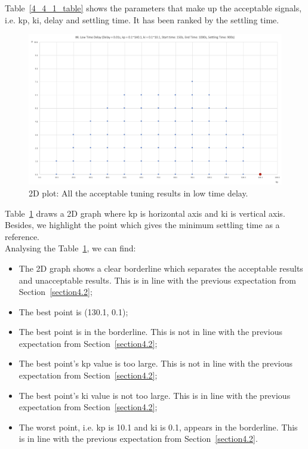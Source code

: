 Table~\ref{4_4_1_table} shows the parameters that make up the acceptable signals, i.e. kp, ki, delay and settling time. It has been ranked by the settling time.  \\

\begin{figure}[htbp]
\centering
\includegraphics[width = .819\textwidth]{figure/4_4_1_2d.png}
\caption{2D plot: All the acceptable tuning results in low time delay.}
\label{4_4_1_2d}
\end{figure}

Table~\ref{4_4_1_2d} draws a 2D graph where kp is horizontal axis and ki is vertical axis. Besides, we highlight the point which gives the minimum settling time as a reference. \\

Analysing the Table~\ref{4_4_1_2d}, we can find: 

\begin{itemize}
\item The 2D graph shows a clear borderline which separates the acceptable results and unacceptable results. This is in line with the previous expectation from Section~\ref{section4.2}; 

\item The best point is (130.1, 0.1); 

\item The best point is in the borderline.  This is not in line with the previous expectation from Section~\ref{section4.2}; 

\item The best point’s kp value is too large. This is not in line with the previous expectation from Section~\ref{section4.2}; 

\item The best point's ki value is not too large.  This is in line with the previous expectation from Section~\ref{section4.2}; 

\item The worst point, i.e. kp is 10.1 and ki is 0.1, appears in the borderline. This is in line with the previous expectation from Section~\ref{section4.2}. 
\end{itemize}

